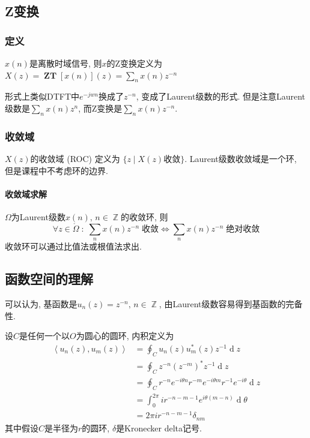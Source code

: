 \documentclass{ctexart}
\DeclareMathOperator{\ZT}{\mathbf{ZT}}
\DeclareMathOperator{\ud}{\mathrm{d}}
\DeclareMathOperator{\Zset}{\mathbb{Z}}
\begin{document}
\subsection{Z变换}
\subsubsection{定义} $x(n)$是离散时域信号,
    则$x$的Z变换定义为$X(z) = \ZT[x(n)](z) = \sum_n x(n) z^{-n}$\par
    形式上类似DTFT中$e^{-jwn}$换成了$z^{-n}$, 变成了Laurent级数的形式.
    但是注意Laurent级数是$\sum_n x (n) z^n$, 而Z变换是$\sum_n x (n) z^{-n}$.
\subsubsection{收敛域} $X(z)$的收敛域 (ROC) 定义为 $\{z \;|\; X(z)\text{收敛}\}$.
    Laurent级数收敛域是一个环, 但是课程中不考虑环的边界.
\paragraph{收敛域求解} $\Omega$为Laurent级数$x(n),\,n\in\Zset$的收敛环, 则
    \[\forall z \in \mathring{\Omega}\;:\;
        \sum_n x(n)z^{-n}\;\text{收敛} \Leftrightarrow
        \sum_n x(n)z^{-n}\;\text{绝对收敛} \]
    收敛环可以通过比值法或根值法求出.
\subsection{函数空间的理解}
    可以认为, 基函数是$u_n(z) = z^{-n},\,n \in \Zset$, 由Laurent级数容易得到基函数的完备性.\par
    设$C$是任何一个以$O$为圆心的圆环, 内积定义为\begin{align*}
        \left\langle u_n(z), u_m(z) \right\rangle &= \oint_C u_n(z) u_m^*(z) z^{-1} \ud z\\
            &= \oint_C z^{-n} (z^{-m})^* z^{-1} \ud z\\
            &= \oint_C r^{-n} e^{-i \theta n} r^{-m} e^{-i \theta m} r^{-1} e^{-i \theta} \ud z\\
            &= \int_0^{2\pi} i r^{-n-m-1} e^{i \theta (m - n)} \ud \theta\\
        &= 2 \pi i r^{-n-m-1} \delta_{nm}\end{align*}
    其中假设$C$是半径为$r$的圆环, $\delta$是Kronecker delta记号.
\end{document}
